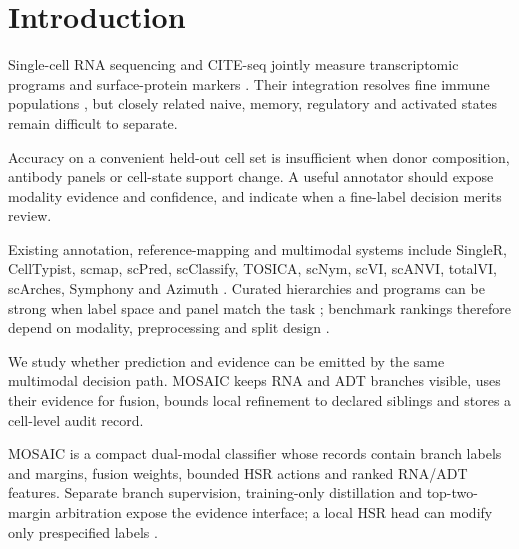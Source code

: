 \documentclass[unnumsec,webpdf,contemporary,large,numbered]{oup-authoring-template}
\begin{document}

\maketitle

\section{Introduction}

Single-cell RNA sequencing and CITE-seq jointly measure transcriptomic programs and surface-protein markers \citep{hao2021,luecken2019,stoeckius2017cite}. Their integration resolves fine immune populations \citep{butler2018,luecken2022,satija2015,stuart2019}, but closely related naive, memory, regulatory and activated states remain difficult to separate.

Accuracy on a convenient held-out cell set is insufficient when donor composition, antibody panels or cell-state support change. A useful annotator should expose modality evidence and confidence, and indicate when a fine-label decision merits review.

Existing annotation, reference-mapping and multimodal systems include SingleR, CellTypist, scmap, scPred, scClassify, TOSICA, scNym, scVI, scANVI, totalVI, scArches, Symphony and Azimuth \citep{aran2019,dominguezconde2022,kiselev2018scmap,alquicira2020scpred,lin2020scclassify,chen2023tosica,kimmel2021scnym,lopez2018,xu2021scvi,gayoso2021totalvi,gayoso2022scvi,lotfollahi2022,kang2021symphony,hao2021}. Curated hierarchies and programs can be strong when label space and panel match the task \citep{caron2025mmochi,kotliar2025starcat}; benchmark rankings therefore depend on modality, preprocessing and split design \citep{abdelaal2019,liu2025multitaskbenchmark,haghverdi2018,korsunsky2019,argelaguet2021}.

We study whether prediction and evidence can be emitted by the same multimodal decision path. MOSAIC keeps RNA and ADT branches visible, uses their evidence for fusion, bounds local refinement to declared siblings and stores a cell-level audit record.

MOSAIC is a compact dual-modal classifier whose records contain branch labels and margins, fusion weights, bounded HSR actions and ranked RNA/ADT features. Separate branch supervision, training-only distillation and top-two-margin arbitration expose the evidence interface; a local HSR head can modify only prespecified labels \citep{shazeer2017moe,vaswani2017}.
\end{document}
